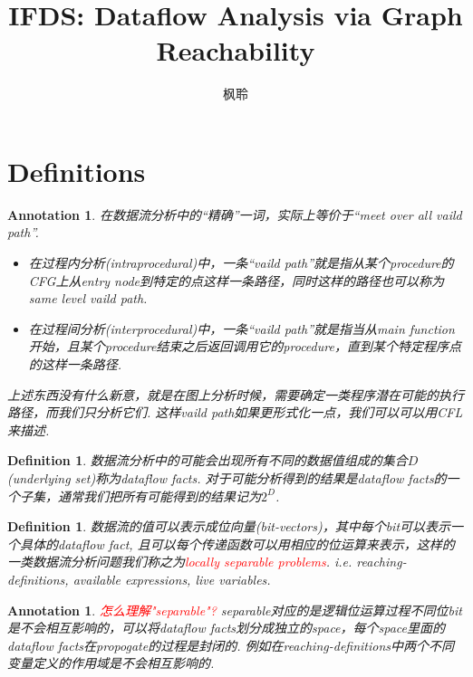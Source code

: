 \documentclass{article}
\newtheorem{definition}[theorem]{Definition}
\newtheorem{annotation}[theorem]{Annotation}
\newcommand{\redt}[1]{\textcolor{red}{#1}}
\begin{document}
\title{IFDS: Dataflow Analysis via Graph Reachability}
\author{枫聆}
\maketitle
\tableofcontents

\newpage
\section{Definitions}


\begin{annotation}
\rm 在数据流分析中的“精确”一词，实际上等价于“meet over all vaild path”. 
\begin{itemize}
	\item 在过程内分析(intraprocedural)中，一条“vaild path”就是指从某个procedure的CFG上从entry node到特定的点这样一条路径，同时这样的路径也可以称为same level vaild path.  
	\item 在过程间分析(interprocedural)中，一条“vaild path”就是指当从main function开始，且某个procedure结束之后返回调用它的procedure，直到某个特定程序点的这样一条路径.  
\end{itemize}
上述东西没有什么新意，就是在图上分析时候，需要确定一类程序潜在可能的执行路径，而我们只分析它们. 这样vaild path如果更形式化一点，我们可以可以用CFL来描述. 
\end{annotation}

\begin{definition}
\rm 数据流分析中的可能会出现所有不同的数据值组成的集合$D$(underlying set)称为dataflow facts. 对于可能分析得到的结果是dataflow facts的一个子集，通常我们把所有可能得到的结果记为$2^D$. 
\end{definition}

\begin{definition}
\rm 数据流的值可以表示成位向量(bit-vectors)，其中每个bit可以表示一个具体的dataflow fact, 且可以每个传递函数可以用相应的位运算来表示，这样的一类数据流分析问题我们称之为\redt{locally separable problems}. i.e. reaching-definitions, available expressions, live variables. 
\end{definition}

\begin{annotation}
\rm \redt{怎么理解"separable"?} separable对应的是逻辑位运算过程不同位bit是不会相互影响的，可以将dataflow facts划分成独立的space，每个space里面的dataflow facts在propogate的过程是封闭的. 例如在reaching-definitions中两个不同变量定义的作用域是不会相互影响的.   
\end{annotation}
\end{document}
